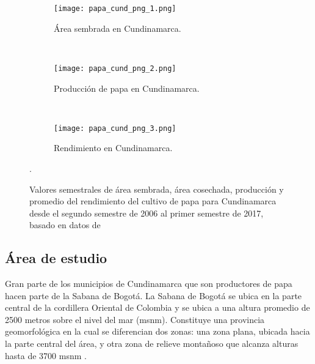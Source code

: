 \begin{figure}[H]
	\begin{center}
		\begin{subfigure}[normla]{0.65\textwidth}
		\texttt{[image: papa\_cund\_png\_1.png]}	
%
%
%
%
		\caption{Área sembrada en Cundinamarca.}
		\label{gra:papa_cund_1}	
		\end{subfigure}
		~
		\begin{subfigure}[normla]{0.65\textwidth}
		\texttt{[image: papa\_cund\_png\_2.png]}	
		\caption{Producción de papa en Cundinamarca.}
		\label{gra:papa_cund_2}	
		\end{subfigure}
		~
		\begin{subfigure}[normla]{0.65\textwidth}
		\texttt{[image: papa\_cund\_png\_3.png]}	
		\caption{Rendimiento en Cundinamarca.}
		\label{gra:papa_cund_3}	
		\end{subfigure}

	\end{center}
	
	\caption{Valores semestrales de área sembrada, área cosechada, producción y promedio del rendimiento del cultivo de papa para Cundinamarca desde el segundo semestre de 2006 al primer semestre de 2017, basado en datos de \citet{madr2017}}.
	 \label{gra:papa_cund}
\end{figure}


\subsection{Área de estudio}


Gran parte de los municipios de Cundinamarca que son productores de papa hacen parte de la Sabana de Bogotá. La Sabana de Bogotá se ubica en la parte central de la cordillera Oriental de Colombia y se ubica a una altura promedio de 2500 metros sobre el nivel del mar (msnm). Constituye una provincia geomorfológica en la cual se diferencian dos zonas: una zona plana, ubicada hacia la parte central del área, y otra zona de relieve montañoso que alcanza alturas hasta de 3700 msnm \citep{hermelin2007entorno}.\\

